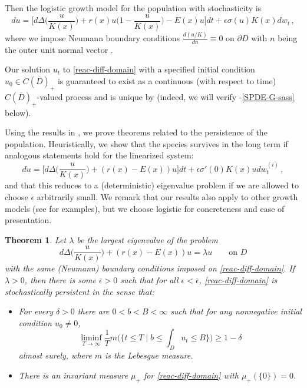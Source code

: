 \documentclass[final]{amsart}
\newtheorem{thm}{Theorem}
\numberwithin{thm}{section}
\numberwithin{equation}{section}
\newcommand{\cdom}{C(\overline D)_+}
\begin{document}
Then the logistic growth model for the population with stochasticity is
\begin{equation}\label{reac-diff-domain}
    du = \Big[d\Delta \Big(\frac{u}{K(x)}\Big) + r(x)u\Big(1 - \frac{u}{K(x)}\Big) - E(x)u\Big]dt + \epsilon \sigma(u)K(x)dw_t \,,
\end{equation}
where we impose 
Neumann boundary conditions $\frac{d(u/K)}{dn} \equiv 0$ on $\partial D$ with $n$
being the outer unit normal vector  . 

 
 Our solution $u_t$ to \eqref{reac-diff-domain} with a specified initial condition $u_0 \in \cdom$ is guaranteed to exist as a continuous (with respect to time) $\cdom$-valued process and is unique by  (indeed, we will verify -\ref{SPDE-G-sass} below).

Using the results in , we prove theorems related to the persistence of the population. Heuristically, we  show that the species survives in the long term if analogous statements hold for the linearized system:
\begin{equation}\label{reac-diff-domain-linearized}
     du = \Big[d\Delta \Big(\frac{u}{K(x)}\Big) + (r(x) - E(x))u\Big]dt + \epsilon\sigma'(0) K(x)udw^{(i)}_t \,,
\end{equation}
and that this reduces to a (deterministic) eigenvalue problem if we are allowed to choose $\epsilon$ arbitrarily small.
We remark that our results also apply to other growth models (see \cite{carrying-capacity} for examples), but we choose logistic for concreteness and ease of presentation.

\begin{thm}\label{reac-diff-domain-thm}
    Let $\lambda$ be the largest eigenvalue of the problem 
    $$
    d\Delta\Big(\frac{u}{K(x)}\Big) + (r(x)-E(x))u = \lambda u
    \qquad \textrm{on } D
    $$ 
    with the same (Neumann) boundary conditions imposed on \eqref{reac-diff-domain}. If $\lambda > 0$, then there is some $\overline \epsilon > 0$ such that for all $\epsilon < \overline \epsilon$, \eqref{reac-diff-domain} is stochastically persistent in the sense that: 
    \begin{itemize}
        \item For every $\delta > 0$ there are $0 < b < B < \infty$ such that for any nonnegative initial condition $u_0 \neq 0$, $$
        \liminf_{T \to \infty} \frac{1}{T}m\Big(\Big\{t \leq T \mid b \leq \int_D u_t \leq B\Big\}\Big) \geq 1 - \delta
        $$ 
        almost surely, where $m$ is the Lebesgue measure.
        \item There is an invariant measure $\mu_+$ for \eqref{reac-diff-domain} with $\mu_+(\{0\}) = 0$.
    \end{itemize}
\end{thm}
\end{document}
